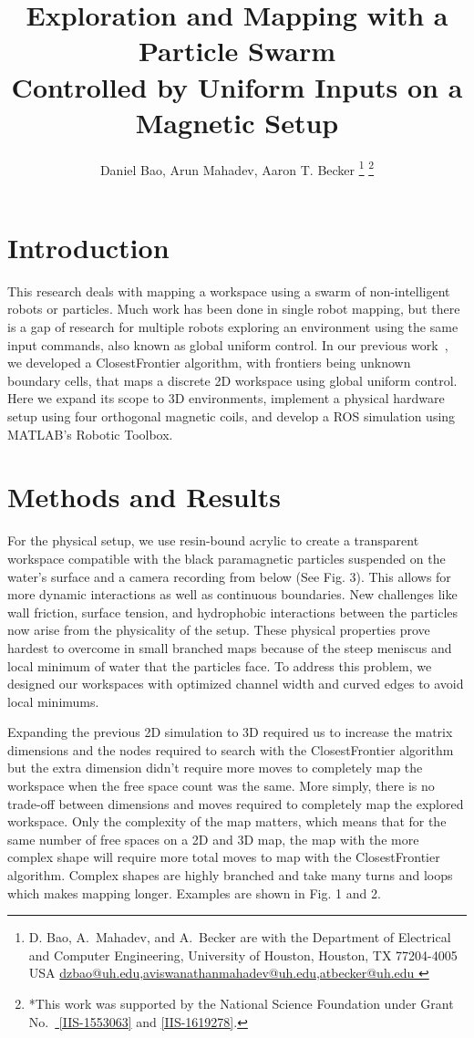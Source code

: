 \documentclass[letterpaper, 9 pt, conference]{ieeeconf}  %
\title{\LARGE \bf
Exploration and Mapping with a Particle Swarm\\ Controlled by Uniform Inputs on a Magnetic Setup
}
\author{Daniel Bao, Arun Mahadev, Aaron T. Becker%
\thanks{D. Bao, A.~Mahadev, and A.~Becker are with the Department of Electrical and Computer Engineering,  University of Houston, Houston, TX 77204-4005 USA 
      \protect\url{dzbao@uh.edu,aviswanathanmahadev@uh.edu,atbecker@uh.edu }}
\thanks{*This work was supported by the National Science Foundation under Grant No.\ \href{http://nsf.gov/awardsearch/showAward?AWD_ID=1553063}{ [IIS-1553063]} and \href{http://nsf.gov/awardsearch/showAward?AWD_ID=1619278}{[IIS-1619278]}.}%
}
\begin{document}
\maketitle
\thispagestyle{empty}
\pagestyle{empty}


\section{Introduction}\label{sec:Introduction}
	This research deals with mapping a workspace using a swarm of non-intelligent robots or particles. Much work has been done in single robot mapping, but there is a gap of research for multiple robots exploring an environment using the same input commands, also known as global uniform control. In our previous work~\cite{AAM}, we developed a ClosestFrontier algorithm, with frontiers being unknown boundary cells, that maps a discrete 2D workspace using global uniform control. Here we expand its scope to 3D environments, implement a physical hardware setup using four orthogonal magnetic coils, and develop a ROS simulation using MATLAB's Robotic Toolbox.
\section{Methods and Results}\label{sec:Methods and Results}
	For the physical setup, we use resin-bound acrylic to create a transparent workspace compatible with the black paramagnetic particles suspended on the water's surface and a camera recording from below (See Fig. 3). This allows for more dynamic interactions as well as continuous boundaries. New challenges like wall friction, surface tension, and  hydrophobic interactions between the particles now arise from the physicality of the setup. These physical properties prove hardest to overcome in small branched maps because of the steep meniscus and local minimum of water that the particles face. To address this problem, we designed our workspaces with optimized channel width and curved edges to avoid local minimums.
	
	Expanding the previous 2D simulation to 3D required us to increase the matrix dimensions and the nodes required to search with the ClosestFrontier algorithm but the extra dimension didn't require more moves to completely map the workspace when the free space count was the same. More simply, there is no trade-off between dimensions and moves required to completely map the explored workspace. Only the complexity of the map matters, which means that for the same number of free spaces on a 2D and 3D map, the map with the more complex shape will require more total moves to map with the ClosestFrontier algorithm. Complex shapes are highly branched and take many turns and loops which makes mapping longer. Examples are shown in Fig. 1 and 2.
	
\end{document}
